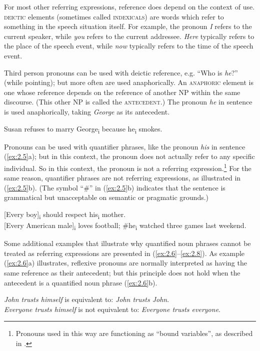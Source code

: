 For most other referring expressions, reference does depend on the context of use. \textsc{deictic} elements (sometimes called \textsc{indexicals}) are words which refer to something in the speech situation itself. For example, the pronoun \textit{I} refers to the current speaker, while \textit{you} refers to the current addressee. \textit{Here} typically refers to the place of the speech event, while \textit{now} typically refers to the time of the speech event.



Third person pronouns can be used with deictic reference, e.g. “Who is \textit{he}?” (while pointing); but more often are used anaphorically. An \textsc{anaphoric} element is one whose reference depends on the reference of another NP within the same discourse. (This other NP is called the \textsc{antecedent}.) The pronoun \textit{he} in sentence  is used anaphorically, taking \textit{George} as its antecedent.


\ea \label{ex:2.4}
Susan refuses to marry George\textsubscript{i} because he\textsubscript{i} smokes.
\z


Pronouns can be used with quantifier phrases, like the pronoun \textit{his} in sentence (\ref{ex:2.5}a); but in this context, the pronoun does not actually refer to any specific individual. So in this context, the pronoun is not a referring expression.\footnote{Pronouns used in this way are functioning as “bound variables”, as described in .} For the same reason, quantifier phrases are not referring expressions, as illustrated in (\ref{ex:2.5}b). (The symbol “\#” in (\ref{ex:2.5}b) indicates that the sentence is grammatical but unacceptable on semantic or pragmatic grounds.)


\ea \label{ex:2.5}
\ea{} [Every boy]\textsubscript{i} should respect his\textsubscript{i} mother.\\        
\ex{} [Every American male]\textsubscript{i} loves football; \#he\textsubscript{i} watched three games last weekend.
\z
\z

Some additional examples that illustrate why quantified noun phrases cannot be treated as referring expressions are presented in (\ref{ex:2.6}--\ref{ex:2.8}). As example (\ref{ex:2.6}a) illustrates, reflexive pronouns are normally interpreted as having the same reference as their antecedent; but this principle does not hold when the antecedent is a quantified noun phrase (\ref{ex:2.6}b).


\ea \label{ex:2.6}
\ea \textit{John trusts himself}  is equivalent to:  \textit{John trusts John}.\\
\ex \textit{Everyone trusts himself}  is not equivalent to:  \textit{Everyone trusts everyone}.
\z
\z


